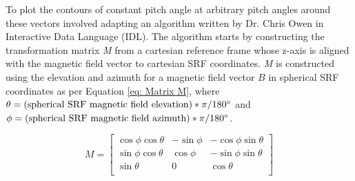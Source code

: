 To plot the contours of constant pitch angle at arbitrary pitch angles around these vectors involved adapting an algorithm written by Dr. Chris Owen in Interactive Data Language (IDL). The algorithm starts by constructing the transformation matrix \textit{M} from a cartesian reference frame whose z-axis is aligned with the magnetic field vector to cartesian SRF coordinates. \textit{M} is constructed using the elevation and azimuth for a magnetic field vector \(B\) in spherical SRF coordinates as per Equation \ref{eq: Matrix M}, where \(\theta=\textrm{(spherical SRF magnetic field elevation)}*\pi/180\degree\) and \(\phi=\textrm{(spherical SRF magnetic field azimuth)}*\pi/180\degree\).

\begin{equation} \label{eq: Matrix M}
    M=
    \begin{bmatrix}
    \cos{\phi}\cos{\theta} & -\sin{\phi} & -\cos{\phi}\sin{\theta}\\
    \sin{\phi}\cos{\theta} & \cos{\phi} & -\sin{\phi}\sin{\theta}\\
    \sin{\theta} & 0 & \cos{\theta}\\
    \end{bmatrix}
\end{equation}

